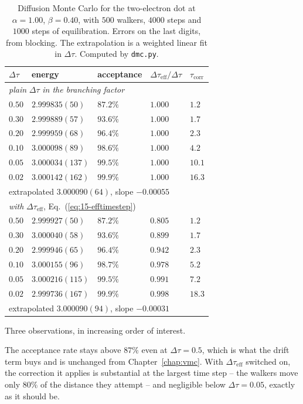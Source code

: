 \begin{table}[h]
\centering
\renewcommand{\arraystretch}{1.2}
\setlength{\tabcolsep}{8pt}
\begin{tabular}{lllll}
\toprule
$\Delta\tau$ & energy & acceptance
  & $\Delta\tau_{\mathrm{eff}}/\Delta\tau$ & $\tau_{\mathrm{corr}}$\\
\midrule
\multicolumn{5}{l}{\emph{plain} $\Delta\tau$ \emph{in the branching factor}}\\
$0.50$ & $2.999835(50)$ & $87.2\%$ & $1.000$ & $1.2$\\
$0.30$ & $2.999889(57)$ & $93.6\%$ & $1.000$ & $1.7$\\
$0.20$ & $2.999959(68)$ & $96.4\%$ & $1.000$ & $2.3$\\
$0.10$ & $3.000098(89)$ & $98.6\%$ & $1.000$ & $4.2$\\
$0.05$ & $3.000034(137)$ & $99.5\%$ & $1.000$ & $10.1$\\
$0.02$ & $3.000142(162)$ & $99.9\%$ & $1.000$ & $16.3$\\
\multicolumn{5}{l}{\quad extrapolated $3.000090(64)$, slope $-0.00055$}\\
\midrule
\multicolumn{5}{l}{\emph{with} $\Delta\tau_{\mathrm{eff}}$,
  Eq.~(\ref{eq:15-efftimestep})}\\
$0.50$ & $2.999927(50)$ & $87.2\%$ & $0.805$ & $1.2$\\
$0.30$ & $3.000040(58)$ & $93.6\%$ & $0.899$ & $1.7$\\
$0.20$ & $2.999946(65)$ & $96.4\%$ & $0.942$ & $2.3$\\
$0.10$ & $3.000155(96)$ & $98.7\%$ & $0.978$ & $5.2$\\
$0.05$ & $3.000216(115)$ & $99.5\%$ & $0.991$ & $7.2$\\
$0.02$ & $2.999736(167)$ & $99.9\%$ & $0.998$ & $18.3$\\
\multicolumn{5}{l}{\quad extrapolated $3.000090(94)$, slope $-0.00031$}\\
\bottomrule
\end{tabular}
\caption{Diffusion Monte Carlo for the two-electron dot at $\alpha=1.00$,
$\beta=0.40$, with $500$ walkers, $4000$ steps and $1000$ steps of
equilibration.  Errors on the last digits, from blocking.  The extrapolation
is a weighted linear fit in $\Delta\tau$.  Computed by \texttt{dmc.py}.}
\label{tab:15-timestep}
\end{table}

Three observations, in increasing order of interest.

The acceptance rate stays above $87\%$ even at $\Delta\tau=0.5$, which is what
the drift term buys and is unchanged from Chapter~\ref{chap:vmc}.  With
$\Delta\tau_{\mathrm{eff}}$ switched on, the correction it applies is
substantial at the largest time step -- the walkers move only $80\%$ of the
distance they attempt -- and negligible below $\Delta\tau=0.05$, exactly as it
should be.

